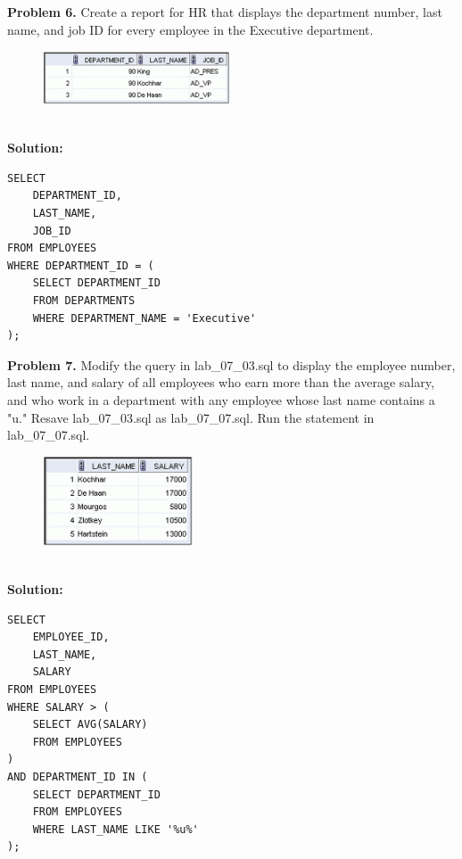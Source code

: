 \documentclass[12pt,a4paper]{article}
\begin{document}
\vspace{0.5cm}

\textbf{Problem 6.} Create a report for HR that displays the department number, last name, and job ID for every employee in the Executive department.
\begin{figure}[htbp]
  \centering
  \includegraphics[width=0.5\textwidth]{Screenshots/76.png}
\end{figure}\\
\textbf{Solution:}
\begin{lstlisting}[style=sqlstyle]
SELECT 
    DEPARTMENT_ID,
    LAST_NAME,
    JOB_ID
FROM EMPLOYEES
WHERE DEPARTMENT_ID = (
    SELECT DEPARTMENT_ID
    FROM DEPARTMENTS
    WHERE DEPARTMENT_NAME = 'Executive'
);
\end{lstlisting}

\vspace{0.5cm}

\textbf{Problem 7.} Modify the query in lab\_07\_03.sql to display the employee number, last name, and salary of all employees who earn more than the average salary, and who work in a department with any employee whose last name contains a "u." Resave lab\_07\_03.sql as lab\_07\_07.sql. Run the statement in lab\_07\_07.sql.
\begin{figure}[htbp]
  \centering
  \includegraphics[width=0.4\textwidth]{Screenshots/75.png}
\end{figure}\\
\newpage
\textbf{Solution:}
\begin{lstlisting}[style=sqlstyle]
SELECT 
    EMPLOYEE_ID,
    LAST_NAME,
    SALARY
FROM EMPLOYEES
WHERE SALARY > (
    SELECT AVG(SALARY)
    FROM EMPLOYEES
)
AND DEPARTMENT_ID IN (
    SELECT DEPARTMENT_ID
    FROM EMPLOYEES
    WHERE LAST_NAME LIKE '%u%'
);
\end{lstlisting}
\end{document}
